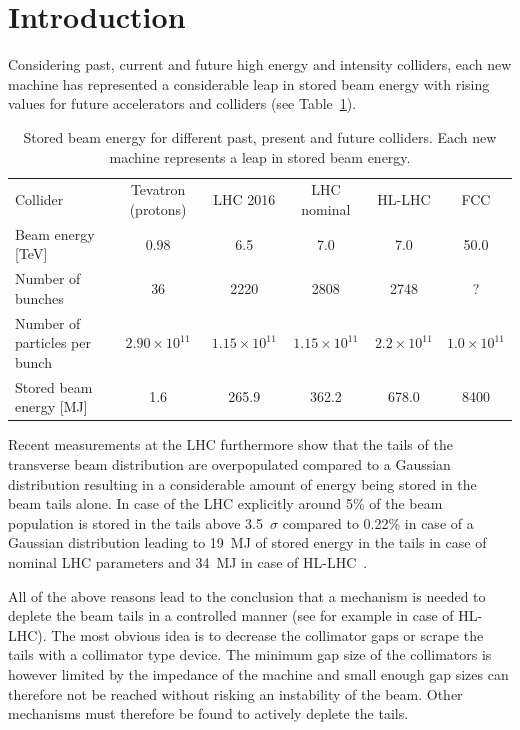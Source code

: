 \documentclass[%
 reprint,
 amsmath,amssymb,
 aps,
prstab,
]{revtex4-1}
\begin{document}

\section{Introduction\label{sec:intro}}%
Considering past, current and future high energy and intensity colliders, each new machine has represented a considerable leap in stored beam energy with rising values for future accelerators and colliders (see Table~\ref{tab:stored_energy}). 
\begin{table}
	\caption{\label{tab:stored_energy}%
		Stored beam energy for different past, present and future colliders. Each new machine represents a leap in stored beam energy.
	}
	\begin{ruledtabular}
		\begin{tabular}{lccccc}
			Collider& Tevatron (protons) \cite{tevatron} & LHC 2016 \cite{chamonix2017param}
			& LHC nominal \cite{lhc_design} & HL-LHC \cite{hlcdr} & FCC \cite{fcc_param_2017} \\
			\colrule
			Beam energy [TeV] & 0.98 & 6.5 & 7.0 & 7.0 & 50.0\\
			Number of bunches & 36 & 2220 & 2808 & 2748 & ? \\
			Number of particles per bunch & $2.90\times 10^{11}$ & $1.15\times 10^{11}$ & $1.15\times 10^{11}$ & $2.2\times 10^{11}$ & $1.0\times 10^{11}$\\
			Stored beam energy [MJ] & 1.6 & 265.9 & 362.2 & 678.0 & 8400 \\
		\end{tabular}
	\end{ruledtabular}
\end{table}
Recent measurements at the LHC furthermore show that the tails of the transverse beam distribution are overpopulated compared to a Gaussian distribution resulting in a considerable amount of energy being stored in the beam tails alone. In case of the LHC explicitly around 5\% of the beam population is stored in the tails above 3.5~$\sigma$ compared to 0.22\% in case of a Gaussian distribution leading to 19~MJ of stored energy in the tails in case of nominal LHC parameters and 34~MJ in case of HL-LHC~\cite{helreview_valentino}.

All of the above reasons lead to the conclusion that a mechanism is needed to deplete the beam tails in a controlled manner (see for example \cite{helreview} in case of HL-LHC). The most obvious idea is to decrease the collimator gaps or scrape the tails with a collimator type device. The minimum gap size of the collimators is however limited by the impedance of the machine and small enough gap sizes can therefore not be reached without risking an instability of the beam. Other mechanisms must therefore be found to actively deplete the tails.
\end{document}
